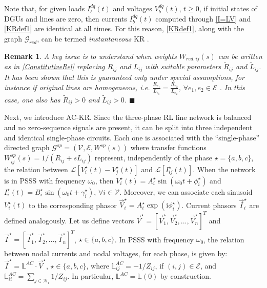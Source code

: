 \documentclass[a4paper]{article}
\theoremstyle{plain}
\newtheorem{rmk}{Remark}
\def\Lset{\mathbb{L}}
\newcommand{\EE}{{\mathcal E}}
\newcommand{\GG}{{\mathcal G}}
\newcommand{\NN}{{\mathcal N}}
\newcommand{\VV}{{\mathcal V}}
\begin{document}
Note that, for given loads $I_{\ell}^{dq}(t)$ and voltages $V^{dq}_b(t)$, $t\geq0$, if initial states of DGUs and lines are zero, then currents $I_b^{dq}(t)$ computed through \eqref{I=LV} and \eqref{KRdef1} are identical at all times. For this reason, \eqref{KRdef1}, along with the graph $\GG_{red}$, can be termed \emph{instantaneous} KR \cite{caliskan2012kron,dhople2014synchronization}.
     
\begin{rmk}
A key issue is to understand when weights $W_{red,ij}(s)$ can be written as in \eqref{ConstitutiveRel} replacing $R_{ij}$ and $L_{ij}$ with suitable parameters $\tilde R_{ij}$ and $\tilde L_{ij}$. It has been shown that this is guaranteed only under special assumptions, for instance if original lines are homogeneous, i.e. $\frac{R_{e_1}}{L_{e_1}}=\frac{R_{e_2}}{L_{e_2}}$, $\forall e_1, e_2 \in \EE$ \cite{caliskan2012kron}. In this case, one also has $\tilde R_{ij}>0$ and $\tilde L_{ij}>0$.
\hspace{68mm}$\blacksquare$\end{rmk}


Next, we introduce AC-KR. Since the three-phase RL line network is balanced and no zero-sequence signals are present, it can be split into three independent and identical single-phase circuits. Each one is associated with the ``single-phase'' directed graph $\GG^{sp}=(\VV, \EE, W^{sp}(s))$ where transfer functions $W_{ij}^{sp}(s)=1/(R_{ij}+sL_{ij})$ represent, independently of the phase $\star=\{a,b,c\}$, the relation between $\mathscr L[V_i^{\star}(t)-V_j^{\star}(t)]$ and $\mathscr  L[I_{ij}^{\star}(t)]$. When the network is in PSSS with frequency $\omega_0$, then $V_i^{\star}(t)=A_i^{\star}\sin(\omega_0t+\phi^{\star}_i)$ and $I_i^{\star}(t)=B_i^{\star}\sin(\omega_0t+\gamma^{\star}_i)$, $\forall i \in \VV$. Moreover, we can associate each sinusoid $V_i^{\star}(t)$ to the corresponding phasor $\vec{V}_i^{\star}=A_i^{\star}\mathrm \exp{( \mathrm i \phi_i^{\star})}$. Current phasors $\vec{I}_i^{\star}$ are defined analogously. Let us define vectors $\vec{V}^{\star}=[\vec{V}_1^{\star},\vec{V}^{\star}_2, ..., \vec{V}^{\star}_n ] ^{T}$ and $\vec{I}^{\star}=[\vec{I}_1^{\star},\vec{I}^{\star}_2, ..., \vec{I}^{\star}_n ]^{T}$, $\star \in \lbrace a,b,c \rbrace$. In PSSS with frequency $\omega_0$, the relation between nodal currents and nodal voltages, for each phase, is given by: $\vec{I}^{\star}=\Lset^{AC}\cdot \vec{V}^{\star}$, $\star \in \lbrace a,b,c \rbrace$, where $\Lset^{AC}_{ij}=-1/Z_{ij}$, if $(i,j)\in\EE$, and $\Lset^{AC}_{ii}=\sum_{j\in\NN_i}1/Z_{ij}$. In particular, $\Lset^{AC}=\Lset(0)$ by construction. 
\end{document}
